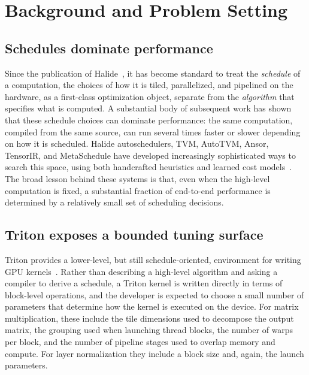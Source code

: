 \section{Background and Problem Setting}
\label{sec:background}

\subsection{Schedules dominate performance}

Since the publication of Halide~\citep{ragankelley2012halide}, it has become standard to treat the \emph{schedule} of a computation, the choices of how it is tiled, parallelized, and pipelined on the hardware, as a first-class optimization object, separate from the \emph{algorithm} that specifies what is computed. A substantial body of subsequent work has shown that these schedule choices can dominate performance: the same computation, compiled from the same source, can run several times faster or slower depending on how it is scheduled. Halide autoschedulers, TVM, AutoTVM, Ansor, TensorIR, and MetaSchedule have developed increasingly sophisticated ways to search this space, using both handcrafted heuristics and learned cost models~\citep{mullapudi2016halide,adams2019halide,chen2018tvm,chen2018learningtensor,zheng2020ansor,zheng2022tensorir,shao2022metaschedule}. The broad lesson behind these systems is that, even when the high-level computation is fixed, a substantial fraction of end-to-end performance is determined by a relatively small set of scheduling decisions.

\subsection{Triton exposes a bounded tuning surface}

Triton provides a lower-level, but still schedule-oriented, environment for writing GPU kernels~\citep{tillet2019triton,openai2021triton}. Rather than describing a high-level algorithm and asking a compiler to derive a schedule, a Triton kernel is written directly in terms of block-level operations, and the developer is expected to choose a small number of parameters that determine how the kernel is executed on the device. For matrix multiplication, these include the tile dimensions used to decompose the output matrix, the grouping used when launching thread blocks, the number of warps per block, and the number of pipeline stages used to overlap memory and compute. For layer normalization they include a block size and, again, the launch parameters.

